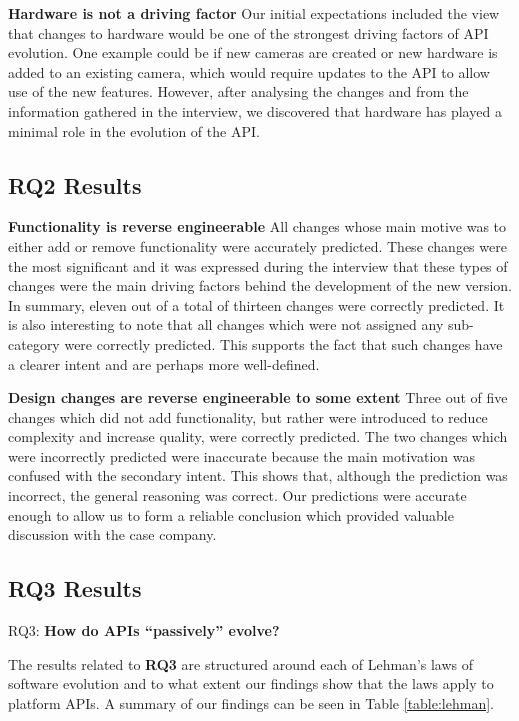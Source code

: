 \documentclass{sig-alternate}
\begin{document}
\smallskip \noindent
\textbf{Hardware is not a driving factor  } %
Our initial expectations included the view that changes to hardware would be one of the strongest driving factors of API evolution. One example could be if new cameras are created or new hardware is added to an existing camera, which would require updates to the API to allow use of the new features. However, after analysing the changes and from the information gathered in the interview, we discovered that hardware has played a minimal role in the evolution of the API. 

\newpage
\subsection{RQ2 Results}

\noindent
\textbf{Functionality is reverse engineerable  } %
All changes whose main motive was to either add or remove functionality were accurately predicted. These changes were the most significant and it was expressed during the interview that these types of changes were the main driving factors behind the development of the new version. In summary, eleven out of a total of thirteen changes were correctly predicted. It is also interesting to note that all changes which were not assigned any sub-category were correctly predicted. This supports the fact that such changes have a clearer intent and are perhaps more well-defined.

\smallskip \noindent
\textbf{Design changes are reverse engineerable to some extent  }  %
Three out of five changes which did not add functionality, but rather were introduced to reduce complexity and increase quality, were correctly predicted. The two changes which were incorrectly predicted were inaccurate because the main motivation was confused with the secondary intent. This shows that, although the prediction was incorrect, the general reasoning was correct. Our predictions were accurate enough to allow us to form a reliable conclusion which provided valuable discussion with the case company. 

\newpage

\subsection{RQ3 Results} \label{results_RQ3} 
\noindent
RQ3: \textbf{How do APIs ``passively'' evolve?}
\smallskip

The results related to \textbf{RQ3} are structured around each of Lehman's laws of software evolution \cite{lehman1980programs} and to what extent our findings show that the laws apply to platform APIs. A summary of our findings can be seen in Table \ref{table:lehman}. 
\end{document}
